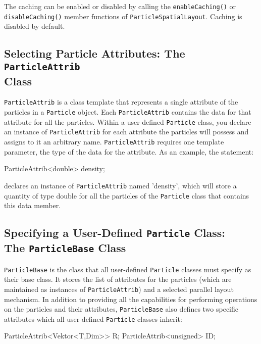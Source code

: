 The caching can be enabled or disabled by calling the \texttt{enableCaching()} or \texttt{disableCaching()} member functions of \texttt{ParticleSpatialLayout}. Caching is disabled by default.


\subsection{Selecting Particle Attributes: The \texttt{ParticleAttrib} \\Class}

\texttt{ParticleAttrib} is a class template that represents a single attribute of the particles in a \texttt{Particle} object. Each \texttt{ParticleAttrib} contains the data for that attribute for all the particles. Within a user-defined \texttt{Particle} class, you declare an instance of \texttt{ParticleAttrib} for each attribute the particles will possess and assigns to it an arbitrary name. \texttt{ParticleAttrib} requires one template parameter, the type of the data for the attribute. As an example, the statement:
\begin{smallcode}
ParticleAttrib<double> density; 
\end{smallcode}

declares an instance of \texttt{ParticleAttrib} named 'density', which will store a quantity of type double for all the particles of the \texttt{Particle} class that contains this data member.

\subsection{Specifying a User-Defined \texttt{Particle} Class: \\The \texttt{ParticleBase} Class}

\texttt{ParticleBase} is the class that all user-defined \texttt{Particle} classes must specify as their base class. It stores the list of attributes for the particles (which are maintained as instances of \texttt{ParticleAttrib}) and a selected parallel layout mechanism. In addition to providing all the capabilities for performing operations on the particles and their attributes, \texttt{ParticleBase} also defines two specific attributes which all user-defined \texttt{Particle} classes inherit:
\begin{smallcode}
ParticleAttrib<Vektor<T,Dim>>  R; 
ParticleAttrib<unsigned>      ID;
\end{smallcode}


